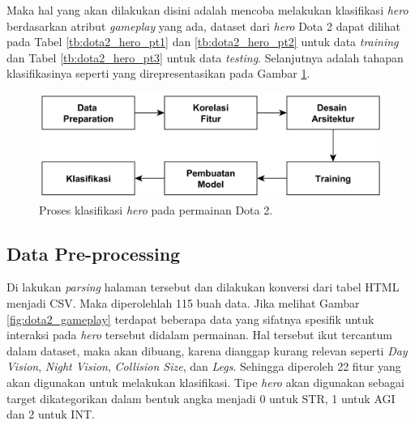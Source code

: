 Maka hal yang akan dilakukan disini adalah mencoba melakukan klasifikasi \textit{hero} berdasarkan atribut \textit{gameplay} yang ada, dataset dari \textit{hero} Dota 2 dapat dilihat pada Tabel \ref{tb:dota2_hero_pt1} dan \ref{tb:dota2_hero_pt2} untuk data \textit{training} dan Tabel \ref{tb:dota2_hero_pt3} untuk data \textit{testing}. Selanjutnya adalah tahapan klasifikasinya seperti yang direpresentasikan pada Gambar \ref{fig:dota2_class_proc}.
\vspace{1ex}

\begin{figure} [!h] \centering
	\includegraphics[scale=0.035]{img/dota2_nn_classification.png}
	\caption{Proses klasifikasi \textit{hero} pada permainan Dota 2.}
	\label{fig:dota2_class_proc}
\end{figure}

\subsection{Data Pre-processing}
\label{sec:sub_sec3_dota2_pre_proc}
\vspace{1ex}

Di lakukan \textit{parsing} halaman tersebut \citep{dota2020} dan dilakukan konversi dari tabel HTML menjadi CSV. Maka diperolehlah 115 buah data. Jika melihat Gambar \ref{fig:dota2_gameplay} terdapat beberapa data yang sifatnya spesifik untuk interaksi pada \textit{hero} tersebut didalam permainan. Hal tersebut ikut tercantum dalam dataset, maka akan dibuang, karena dianggap kurang relevan seperti \textit{Day Vision}, \textit{Night Vision}, \textit{Collision Size}, dan \textit{Legs}. Sehingga diperoleh 22 fitur yang akan digunakan untuk melakukan klasifikasi. Tipe \textit{hero} akan digunakan sebagai target dikategorikan dalam bentuk angka menjadi 0 untuk STR, 1 untuk AGI dan 2 untuk INT.
\vspace{1ex}

